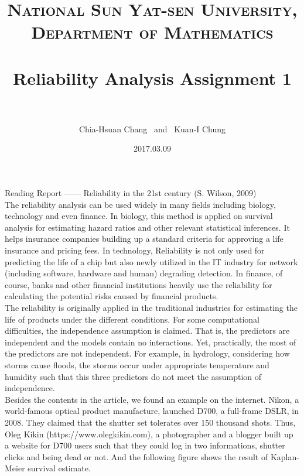\documentclass[paper=a4, fontsize=11pt]{scrartcl} %
\title{	
\normalfont \normalsize 
\textsc{National Sun Yat-sen University, Department of Mathematics} \\ [25pt] %
\horrule{0.5pt} \\[0.4cm] %
\huge Reliability Analysis Assignment 1\\ %
\horrule{2pt} \\[0.5cm] %
}
\author{Chia-Hsuan Chang \ and \ Kuan-I Chung} %
\date{\normalsize 2017.03.09} %
\numberwithin{equation}{section} %
\numberwithin{figure}{section} %
\numberwithin{table}{section} %
\begin{document}
\maketitle %


\large{Reading Report ------ Reliability in the 21st century (S. Wilson, 2009)}\\

\qquad The reliability analysis can be used widely in many fields including biology, technology and even finance. In biology, this method is applied on survival analysis for estimating hazard ratios and other relevant statistical inferences. It helps insurance companies building up a standard criteria for approving a life insurance and pricing fees. In technology, Reliability is not only used for predicting the life of a chip but also newly utilized in the IT industry for network (including software, hardware and human) degrading detection. In finance, of course, banks and other financial institutions heavily use the reliability for calculating the potential risks caused by financial products.\\

\qquad The reliability is originally applied in the traditional industries for estimating the life of products under the different conditions. For some computational difficulties, the independence assumption is claimed. That is, the
predictors are independent and the models contain no interactions. Yet, practically, the most of the predictors are not independent. For example, in hydrology, considering how storms cause floods, the storms occur under appropriate temperature and humidity such that this three predictors do not meet the assumption of independence. \\

\qquad Besides the contents in the article, we found an example on the internet. Nikon, a world-famous optical product manufacture, launched D700, a full-frame DSLR, in 2008. They claimed that the shutter set tolerates over 150 thousand shots. Thus, Oleg Kikin (https://www.olegkikin.com), a photographer and a blogger built up a website for D700 users such that they could log in two informations, shutter clicks and being dead or not. And the following figure shows the result of Kaplan-Meier survival estimate. \\
\end{document}
